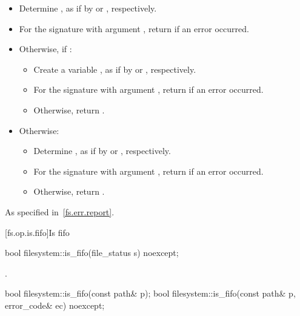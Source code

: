 \begin{itemdescr}
\pnum
\effects
\begin{itemize}
\item Determine ,
   as if by  or , respectively.
\item For the signature with argument ,
   return  if an error occurred.
\item Otherwise, if :
  \begin{itemize}
  \item Create a variable ,
     as if by  or
     , respectively.
  \item For the signature with argument ,
     return  if an error occurred.
  \item Otherwise, return .
  \end{itemize}
\item
Otherwise:
  \begin{itemize}
  \item Determine ,
    as if by  or , respectively.
  \item For the signature with argument ,
    return  if an error occurred.
  \item Otherwise, return .
  \end{itemize}
\end{itemize}

\pnum
\throws
As specified in~\ref{fs.err.report}.
\end{itemdescr}


[fs.op.is.fifo]{Is fifo}

%
\begin{itemdecl}
bool filesystem::is_fifo(file_status s) noexcept;
\end{itemdecl}

\begin{itemdescr}
\pnum
\returns
{}.
\end{itemdescr}


%
\begin{itemdecl}
bool filesystem::is_fifo(const path& p);
bool filesystem::is_fifo(const path& p, error_code& ec) noexcept;
\end{itemdecl}

